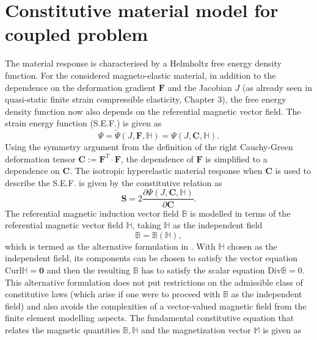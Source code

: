 \section{Constitutive material model for coupled problem}
\label{sec:const_law_coupled}
The material response is characterised by a Helmholtz free energy density function. For the considered magneto-elastic material, in addition to the dependence on the deformation gradient $\mathbf{F}$ and the Jacobian $J$ (as already seen in quasi-static finite strain compressible elasticity, Chapter 3), the free energy density function now also depends on the referential magnetic vector field. The strain energy function (S.E.F.) is given as 
\begin{equation}
\Psi = \widetilde{\Psi} (J, \mathbf{F}, \mathbb{H}) = \Psi (J, \mathbf{C}, \mathbb{H}).
\label{eq:3.1}
\end{equation}
Using the symmetry argument from the definition of the right Cauchy-Green deformation tensor $\mathbf{C} := \mathbf{F}^T \cdot \mathbf{F}$, the dependence of $\mathbf{F}$ is simplified to a dependence on $\mathbf{C}$. The isotropic hyperelastic material response when $\mathbf{C}$ is used to describe the S.E.F. is given by the constitutive relation as
\begin{equation}
\mathbf{S} = 2 \dfrac{\partial \Psi (J, \mathbf{C}, \mathbb{H})}{\partial \mathbf{C}}.
\label{eq:3.2}
\end{equation}
The referential magnetic induction vector field $\mathbb{B}$ is modelled in terms of the referential magnetic vector field $\mathbb{H}$, taking $\mathbb{H}$ as the independent field
\begin{equation}
\mathbb{B} = \mathbb{B}(\mathbb{H}),
\label{eq:3.3}
\end{equation}
which is termed as the alternative formulation in \cite{dorfmann2004}. With $\mathbb{H}$ chosen as the independent field, its components can be chosen to satisfy the vector equation $\text{Curl} \mathbb{H} = \mathbf{0}$ and then the resulting $\mathbb{B}$ has to satisfy the scalar equation $\text{Div} \mathbb{B} = 0$. This alternative formulation does not put restrictions on the admissible class of constitutive laws (which arise if one were to proceed with $\mathbb{B}$ as the independent field) and also avoids the complexities of a vector-valued magnetic field from the finite element modelling aspects. The fundamental constitutive equation that relates the magnetic quantities $\mathbb{B}, \mathbb{H}$ and the magnetization vector $\mathbb{M}$ is given as \cite{dorfmann2004,dorfmann2005}
